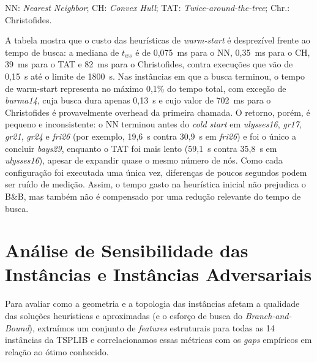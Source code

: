 \documentclass[12pt]{article}
\begin{document}
\begin{table}[H]
\par\smallskip
{\footnotesize NN: \textit{Nearest Neighbor}; CH: \textit{Convex Hull}; TAT: \textit{Twice-around-the-tree}; Chr.: Christofides.}

\caption{Custo e retorno do \textit{warm-start} no Branch-and-Bound: tempo gasto na heurística inicial ($t_{ws}$, em ms) e tempo total de execução ($t_{tot}$, em s, já incluindo $t_{ws}$). NA indica execução interrompida no limite de 30 minutos. A última linha mostra a mediana de $t_{ws}$ nas 14 instâncias. Cada configuração foi executada uma única vez.}
\end{table}

A tabela mostra que o custo das heurísticas de \textit{warm-start} é desprezível frente ao tempo de busca: a mediana de $t_{ws}$ é de 0{,}075~ms para o NN, 0{,}35~ms para o CH, 39~ms para o TAT e 82~ms para o Christofides, contra execuções que vão de 0{,}15~s até o limite de 1800~s. Nas instâncias em que a busca terminou, o tempo de warm-start representa no máximo 0{,}1\% do tempo total, com exceção de \textit{burma14}, cuja busca dura apenas 0{,}13~s e cujo valor de 702~ms para o Christofides é provavelmente overhead da primeira chamada. O retorno, porém, é pequeno e inconsistente: o NN terminou antes do \textit{cold start} em \textit{ulysses16}, \textit{gr17}, \textit{gr21}, \textit{gr24} e \textit{fri26} (por exemplo, 19{,}6~s contra 30{,}9~s em \textit{fri26}) e foi o único a concluir \textit{bays29}, enquanto o TAT foi mais lento (59{,}1~s contra 35{,}8~s em \textit{ulysses16}), apesar de expandir quase o mesmo número de nós. Como cada configuração foi executada uma única vez, diferenças de poucos segundos podem ser ruído de medição. Assim, o tempo gasto na heurística inicial não prejudica o B\&B, mas também não é compensado por uma redução relevante do tempo de busca.

\section{Análise de Sensibilidade das Instâncias e Instâncias Adversariais}
\label{sec:sensibilidade}

Para avaliar como a geometria e a topologia das instâncias afetam a qualidade das soluções heurísticas e aproximadas (e o esforço de busca do \textit{Branch-and-Bound}), extraímos um conjunto de \textit{features} estruturais para todas as 14 instâncias da TSPLIB e correlacionamos essas métricas com os \textit{gaps} empíricos em relação ao ótimo conhecido.
\end{document}
